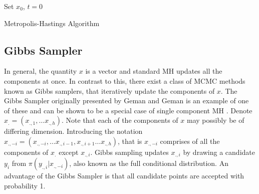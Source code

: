 	\begin{algorithm}[H]
	\label{alg:MetHast}
 Set $x_0$, $t=0$\; 


 \caption{Metropolis-Hastings Algorithm}
\end{algorithm}

\subsection{Gibbs Sampler}
In general, the quantity $x$ is a vector and standard MH updates all the components at once. In contrast to this, there exist a class of MCMC methods known as Gibbs samplers, that iteratively update the components of $x$. The Gibbs Sampler originally presented by  Geman and Geman \cite{geman1984stochastic} is an example of one of these and can be shown to be a special case of single component MH \cite{gilks1995markov}. 
Denote $x_. = (x_{.,1},\ldots x_{.,h})$. Note that each of the components of $x$ may possibly be of differing dimension. 
Introducing the notation $x_{.,-i} = (x_{.,-i},\ldots x_{.,i-1}, x_{.,i+1} \ldots x_{.,h})$, that is $x_{.,-i}$ comprises of all the components of $x_.$ except $x_{.,i}$. Gibbs sampling updates $x_{.,i}$ by drawing a candidate $y_i$ from $\pi(y_{.,i}|x_{.,-i})$, also known as the full conditional distribution. An advantage of the Gibbs Sampler is that all candidate points are accepted with probability 1.

